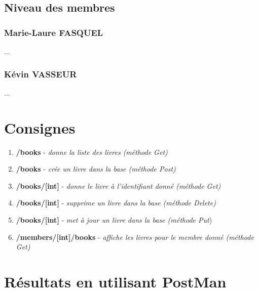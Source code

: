 \documentclass{report}
\begin{document}
		\subsection{Niveau des membres}
			\subsubsection{Marie-Laure FASQUEL}
			...
			\subsubsection{K\'{e}vin VASSEUR}
			...
			
	\section{Consignes}
	\begin{enumerate}
		\item \textbf{/books} - \textit{donne la liste des livres (m\'{e}thode Get)}
		\item \textbf{/books} - \textit{cr\'{e}e un livre dans la base (m\'{e}thode Post)}
		\item \textbf{/books/[int]} - \textit{donne le livre \`{a} l'identifiant donn\'{e} (m\'{e}thode Get)} 
		\item \textbf{/books/[int]} - \textit{supprime un livre dans la base (m\'{e}thode Delete)} 
		\item \textbf{/books/[int]} - \textit{met \`{a} jour un livre dans la base (m\'{e}thode Put}) 
		\item \textbf{/members/[int]/books} - \textit{affiche les livres pour le membre donn\'{e} (m\'{e}thode Get)} 
	\end{enumerate}
	
	
	\section{R\'{e}sultats en utilisant PostMan}
\end{document}
